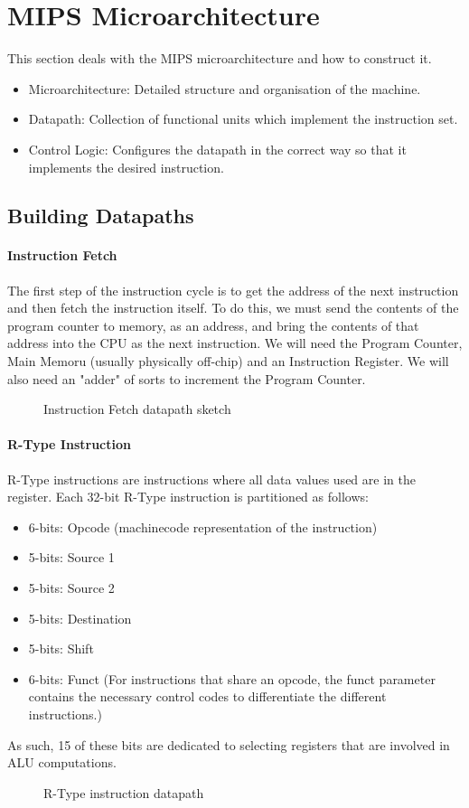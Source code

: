 \section{MIPS Microarchitecture}
This section deals with the MIPS microarchitecture and how to construct it.
\begin{itemize}
	\item Microarchitecture: Detailed structure and organisation of the machine.
	\item Datapath: Collection of functional units which implement the instruction set.
	\item Control Logic: Configures the datapath in the correct way so that it implements the desired instruction.
\end{itemize}
\subsection{Building Datapaths}
\paragraph{Instruction Fetch}
The first step of the instruction cycle is to get the address of the next instruction and then fetch the instruction itself. To do this, we must send the contents of the program counter to memory, as an address, and bring the contents of that address into the CPU as the next instruction. We will need the Program Counter, Main Memoru (usually physically off-chip) and an Instruction Register. We will also need an "adder" of sorts to increment the Program Counter. 
\begin{figure}[!htb]
	\caption{\label{fig:mips1} Instruction Fetch datapath sketch}
\end{figure}
\paragraph{R-Type Instruction}
R-Type instructions are instructions where all data values used are in the register. Each 32-bit R-Type instruction is partitioned as follows:
\begin{itemize}
	\item 6-bits: Opcode (machinecode representation of the instruction)
	\item 5-bits: Source 1
	\item 5-bits: Source 2
	\item 5-bits: Destination
	\item 5-bits: Shift
	\item 6-bits: Funct (For instructions that share an opcode, the funct parameter contains the necessary control codes to differentiate the different instructions.)
\end{itemize}
As such, 15 of these bits are dedicated to selecting registers that are involved in ALU computations.
\begin{figure}[!htb]
	\caption{\label{fig:rtype} R-Type instruction datapath}
\end{figure}

